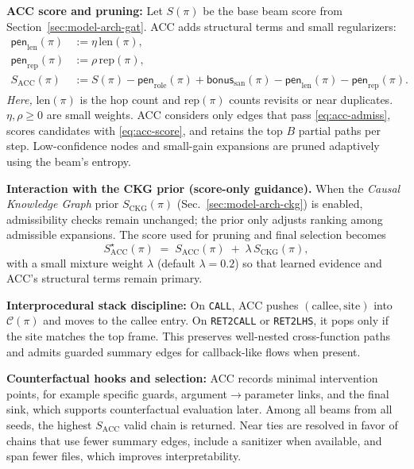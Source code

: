 \documentclass{buthesis}
\begin{document}
\textbf{ACC score and pruning:}
Let $S(\pi)$ be the base beam score from Section~\ref{sec:model-arch-gat}. ACC adds structural terms and small regularizers:
\begin{align}
\label{eq:acc-len}
\mathsf{pen}_{\mathrm{len}}(\pi) &:= \eta\,\mathrm{len}(\pi),\\
\label{eq:acc-rep}
\mathsf{pen}_{\mathrm{rep}}(\pi) &:= \rho\,\mathrm{rep}(\pi),\\
\label{eq:acc-score}
S_{\mathrm{ACC}}(\pi) &:=
S(\pi) - \mathsf{pen}_{\mathrm{role}}(\pi) + \mathsf{bonus}_{\mathrm{san}}(\pi)
- \mathsf{pen}_{\mathrm{len}}(\pi) - \mathsf{pen}_{\mathrm{rep}}(\pi).
\end{align}
\emph{Here,} $\mathrm{len}(\pi)$ is the hop count and $\mathrm{rep}(\pi)$ counts revisits or near duplicates. $\eta,\rho\!\ge\!0$ are small weights. ACC considers only edges that pass \eqref{eq:acc-admiss}, scores candidates with \eqref{eq:acc-score}, and retains the top $B$ partial paths per step. Low-confidence nodes and small-gain expansions are pruned adaptively using the beam’s entropy.

\textbf{Interaction with the CKG prior (score-only guidance).}
When the \emph{Causal Knowledge Graph} prior $S_{\mathrm{CKG}}(\pi)$ (Sec.~\ref{sec:model-arch-ckg}) is enabled, admissibility checks remain unchanged; the prior only adjusts ranking among admissible expansions. The score used for pruning and final selection becomes
\begin{equation}
\label{eq:acc-score-ckg}
S_{\mathrm{ACC}}^{\star}(\pi) \;=\; S_{\mathrm{ACC}}(\pi) \;+\; \lambda\, S_{\mathrm{CKG}}(\pi),
\end{equation}
with a small mixture weight $\lambda$ (default $\lambda{=}0.2$) so that learned evidence and ACC’s structural terms remain primary.

\textbf{Interprocedural stack discipline:}
On \texttt{CALL}, ACC pushes $(\mathrm{callee},\mathrm{site})$ into $\mathcal{C}(\pi)$ and moves to the callee entry. On \texttt{RET2CALL} or \texttt{RET2LHS}, it pops only if the site matches the top frame. This preserves well-nested cross-function paths and admits guarded summary edges for callback-like flows when present.

\textbf{Counterfactual hooks and selection:}
ACC records minimal intervention points, for example specific guards, argument$\rightarrow$parameter links, and the final sink, which supports counterfactual evaluation later. Among all beams from all seeds, the highest $S_{\mathrm{ACC}}$ valid chain is returned. Near ties are resolved in favor of chains that use fewer summary edges, include a sanitizer when available, and span fewer files, which improves interpretability.
\end{document}
